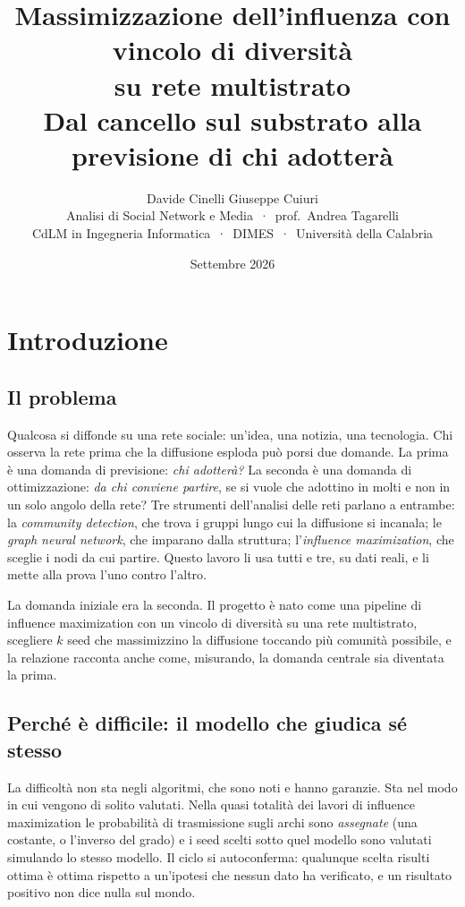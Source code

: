 \documentclass[11pt,a4paper]{article}
\title{Massimizzazione dell'influenza con vincolo di diversità\\su rete multistrato\\[4pt]
  \large Dal cancello sul substrato alla previsione di chi adotterà}
\author{Davide Cinelli \qquad Giuseppe Cuiuri\\[10pt]
  \small Analisi di Social Network e Media \,·\, prof.~Andrea Tagarelli\\
  \small CdLM in Ingegneria Informatica \,·\, DIMES \,·\, Università della Calabria}
\date{Settembre 2026}
\begin{document}
\maketitle

\tableofcontents
\clearpage

\section{Introduzione}
\label{sec:intro}

\subsection{Il problema}
Qualcosa si diffonde su una rete sociale: un'idea, una notizia, una tecnologia. Chi osserva la rete prima che la diffusione esploda può porsi due domande. La prima è una domanda di previsione: \emph{chi adotterà?} La seconda è una domanda di ottimizzazione: \emph{da chi conviene partire}, se si vuole che adottino in molti e non in un solo angolo della rete? Tre strumenti dell'analisi delle reti parlano a entrambe: la \emph{community detection}, che trova i gruppi lungo cui la diffusione si incanala; le \emph{graph neural network}, che imparano dalla struttura; l'\emph{influence maximization}, che sceglie i nodi da cui partire. Questo lavoro li usa tutti e tre, su dati reali, e li mette alla prova l'uno contro l'altro.

La domanda iniziale era la seconda. Il progetto è nato come una pipeline di influence maximization con un vincolo di diversità su una rete multistrato, scegliere $k$ seed che massimizzino la diffusione toccando più comunità possibile, e la relazione racconta anche come, misurando, la domanda centrale sia diventata la prima.

\subsection{Perché è difficile: il modello che giudica sé stesso}
La difficoltà non sta negli algoritmi, che sono noti e hanno garanzie. Sta nel modo in cui vengono di solito valutati. Nella quasi totalità dei lavori di influence maximization le probabilità di trasmissione sugli archi sono \emph{assegnate} (una costante, o l'inverso del grado) e i seed scelti sotto quel modello sono valutati simulando lo stesso modello. Il ciclo si autoconferma: qualunque scelta risulti ottima è ottima rispetto a un'ipotesi che nessun dato ha verificato, e un risultato positivo non dice nulla sul mondo.
\end{document}
